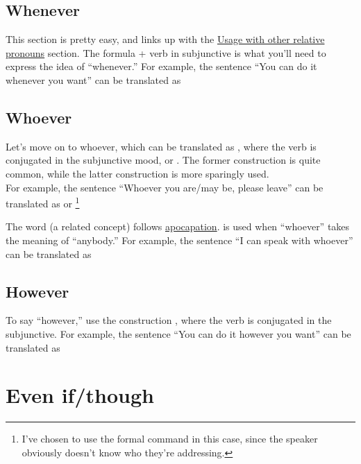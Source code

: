 \subsection{Whenever}

This section is pretty easy, and links up with the \hyperref[sec:relpro]{Usage with other relative pronouns} section.
The formula  + verb in subjunctive is what you'll need to express the idea of ``whenever.'' For example, the sentence ``You can do it whenever you want'' can be translated as 

\subsection{Whoever}
Let's move on to whoever, which can be translated as , where the verb is conjugated in the subjunctive mood, or . The former construction is quite common, while the latter construction is more sparingly used. \\

For example, the sentence  ``Whoever you are/may be, please leave'' can be translated as  or  \footnote{I've chosen to use the formal command in this case, since the speaker obviously doesn't know who they're addressing.} 


The word  (a related concept) follows \hyperref[sec:apo]{apocapation}.  is used when ``whoever'' takes the meaning of ``anybody.'' For example, the sentence ``I can speak with whoever'' can be translated as 

\subsection{However}
To say ``however,'' use the construction , where the verb is conjugated in the subjunctive. For example, the sentence ``You can do it however you want'' can be translated as  

\section{Even if/though}

